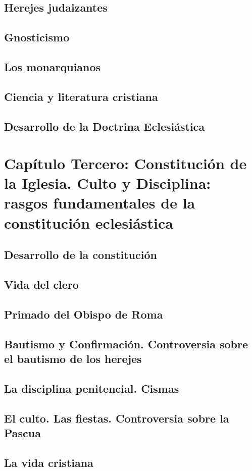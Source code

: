 \raggedbottom{} \documentclass[12pt, a4paper, openany]{book} %
\begin{document}
\section{Herejes judaizantes}
\section{Gnosticismo}
\section{Los monarquianos}
\section{Ciencia y literatura cristiana}
\section{Desarrollo de la Doctrina Eclesiástica}
\chapter{Capítulo Tercero: Constitución de la Iglesia. Culto y Disciplina: rasgos fundamentales de la constitución eclesiástica}
\section{Desarrollo de la constitución}
\section{Vida del clero}
\section{Primado del Obispo de Roma}
\section{Bautismo y Confirmación. Controversia sobre el bautismo de los herejes}
\section{La disciplina penitencial. Cismas}
\section{El culto. Las fiestas. Controversia sobre la Pascua}
\section{La vida cristiana}
\end{document}
